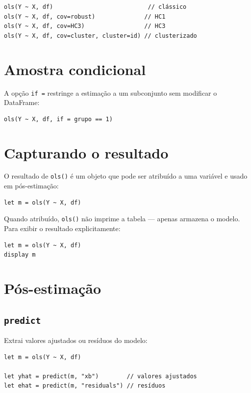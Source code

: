 \begin{lstlisting}[caption={Variantes de erro padrão}]
ols(Y ~ X, df)                           // clássico
ols(Y ~ X, df, cov=robust)              // HC1
ols(Y ~ X, df, cov=HC3)                 // HC3
ols(Y ~ X, df, cov=cluster, cluster=id) // clusterizado
\end{lstlisting}

\section{Amostra condicional}

A opção \lstinline{if =} restringe a estimação a um subconjunto sem modificar o DataFrame:

\begin{lstlisting}
ols(Y ~ X, df, if = grupo == 1)
\end{lstlisting}

\section{Capturando o resultado}

O resultado de \lstinline{ols()} é um objeto que pode ser atribuído a uma variável
e usado em pós-estimação:

\begin{lstlisting}
let m = ols(Y ~ X, df)
\end{lstlisting}

Quando atribuído, \lstinline{ols()} não imprime a tabela — apenas armazena o modelo.
Para exibir o resultado explicitamente:

\begin{lstlisting}
let m = ols(Y ~ X, df)
display m
\end{lstlisting}

\section{Pós-estimação}

\subsection{\texttt{predict}}

Extrai valores ajustados ou resíduos do modelo:

\begin{lstlisting}
let m = ols(Y ~ X, df)

let yhat = predict(m, "xb")        // valores ajustados
let ehat = predict(m, "residuals") // resíduos
\end{lstlisting}

